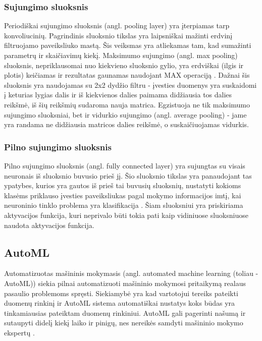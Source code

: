 \documentclass{VUMIFPSbakalaurinis}
\begin{document}
\subsubsection{Sujungimo sluoksnis}
Periodiškai sujungimo sluoksnis (angl. pooling layer) yra įterpiamas tarp konvoliucinių. Pagrindinis sluoksnio tikslas yra laipsniškai mažinti erdvinį filtruojamo paveiksliuko mastą.
Šis veiksmas yra atliekamas tam, kad sumažinti parametrų ir skaičiavimų kiekį. Maksimumo sujungimo (angl. max pooling) sluoksnis, nepriklausomai nuo kiekvieno
sluoksnio gylio, yra erdviškai (ilgis ir plotis) keičiamas ir rezultatas gaunamas naudojant MAX operaciją \cite{7927440}. Dažnai šis sluoksnis yra naudojamas su 2x2 dydžio filtru - įvesties 
duomenys yra suskaidomi į keturias lygias dalis ir iš kiekvienos dalies paimama didžiausia tos dalies reikšmė, iš šių reikšmių sudaroma nauja matrica. Egzistuoja ne tik 
maksimumo sujungimo sluoksniai, bet ir vidurkio sujungimo (angl. average pooling) - jame yra randama ne didžiausia matricos dalies reikšmė, o suskaičiuojamas vidurkis.

\subsubsection{Pilno sujungimo sluoksnis}
Pilno sujungimo sluoksnis (angl. fully connected layer) yra sujungtas su visais 
neuronais iš sluoksnio buvusio prieš jį. Šio sluoksnio tikslas yra panaudojant tas ypatybes, kurios yra gautos iš prieš tai buvusių sluoksnių, nustatyti kokioms 
klasėms priklauso įvesties paveiksliukas pagal mokymo informacijos imtį, kai neuroninio tinklo problema yra klasifikacija \cite{layers-fullyconnected}. Šiam 
sluoksniui yra priskiriama aktyvacijos funkcija, kuri neprivalo būti tokia pati kaip vidiniuose sluoksniuose naudota aktyvacijos funkcija. 

\subsection{AutoML}

Automatizuotas mašininis mokymasis (angl. automated machine learning (toliau - AutoML)) siekia pilnai automatizuoti mašininio mokymosi pritaikymą realaus pasaulio problemoms spręsti. Siekiamybė yra kad vartotojui tereiks pateikti duomenų rinkinį ir AutoML sistema automatiškai nustatys koks būdas yra tinkamiausias pateiktam duomenų rinkiniui. AutoML gali pagerinti našumą ir sutaupyti didelį kiekį laiko ir pinigų, nes nereikės samdyti mašininio mokymo ekspertų \cite{14f00e7a0861477a81f65b5c51f660f4}.
\end{document}
